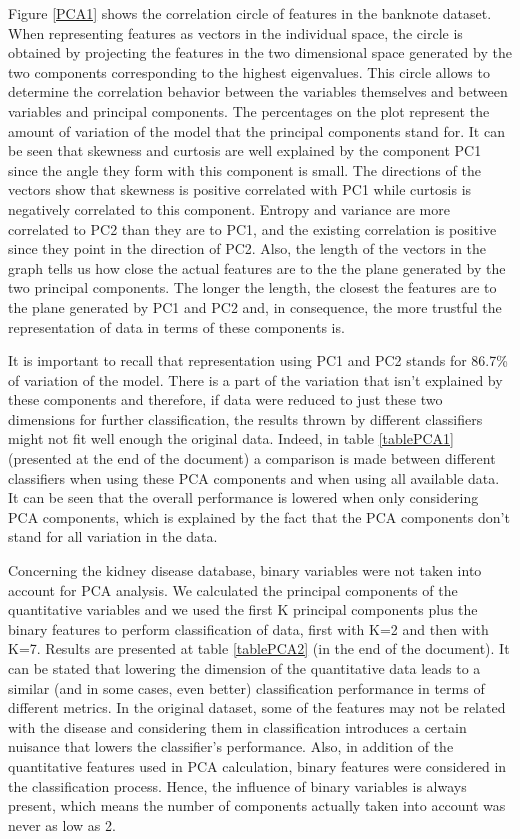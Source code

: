 \documentclass[11pt,a4paper]{article}
\begin{document}
Figure \ref{PCA1} shows the correlation circle of features in the banknote dataset. When representing features as vectors in the individual space, the circle is obtained by projecting the features in the two dimensional space generated by the two components corresponding to the highest eigenvalues. This circle allows to determine the correlation behavior between the variables themselves and between variables and principal components. 
The percentages on the plot represent the amount of variation of the model that the principal components stand for. 
It can be seen that skewness and curtosis are well explained by the component PC1 since the angle they form with this component is small. The directions of the vectors show that skewness is positive correlated with PC1 while curtosis is negatively correlated to this component. Entropy and variance are more correlated to PC2 than they are to PC1, and the existing correlation is positive since they point in the direction of PC2. Also, the length of the vectors in the graph tells us how close the actual features are to the the plane generated by the two principal components. The longer the length, the closest the features are to the plane generated by PC1 and PC2 and, in consequence, the more trustful the representation of data in terms of these components is. 

It is important to recall that representation using PC1 and PC2 stands for 86.7\% of variation of the model. There is a part of the variation that isn't explained by these components and therefore, if data were reduced to just these two dimensions for further classification, the results thrown by different classifiers might not fit well enough the original data. Indeed, in table \ref{tablePCA1} (presented at the end of the document) a comparison is made between different classifiers when using these PCA components and when using all available data. It can be seen that the overall performance is lowered when only considering PCA components, which is explained by the fact that the PCA components don't stand for all variation in the data. 

Concerning the kidney disease database, binary variables were not taken into account for PCA analysis. We calculated the principal components of the quantitative variables and we used the first K principal components plus the binary features to perform classification of data, first with K=2 and then with K=7. Results are presented at table \ref{tablePCA2} (in the end of the document). It can be stated that lowering the dimension of the quantitative data leads to a similar (and in some cases, even better) classification performance in terms of different metrics. In the original dataset, some of the features may not be related with the disease and considering them in classification introduces a certain nuisance that lowers the classifier's performance. Also, in addition of the quantitative features used in PCA calculation, binary features were  considered in the classification process. Hence, the influence of binary variables is always present, which means the number of components actually taken into account was never as low as 2. 
\end{document}
